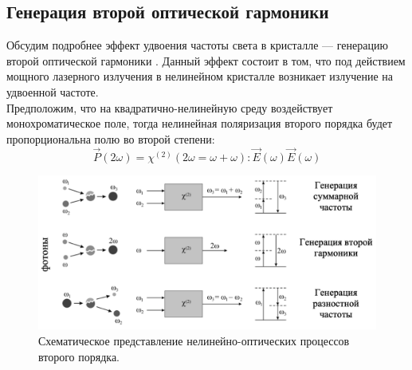 \subsection*{Генерация второй оптической гармоники} 
\hspace{2mm}
Обсудим подробнее эффект удвоения частоты света в кристалле — генерацию второй оптической гармоники \cite{achmanov2}. Данный эффект состоит в том, что под действием мощного лазерного излучения в нелинейном кристалле возникает излучение на удвоенной частоте.
\\
\hspace{2mm}
Предположим, что на квадратично-нелинейную среду воздействует монохроматическое поле, тогда нелинейная поляризация второго порядка будет пропорциональна полю во второй степени:
\begin{equation}\label{thg1}
\vec{P}(2\omega) = \chi^{(2)}(2\omega = \omega + \omega):\vec{E}(\omega)\vec{E} (\omega)
\end{equation}

\begin{figure}[h]
	\centering
	\includegraphics[width=0.6\linewidth]{images/shg.png}
	\caption{Схематическое представление нелинейно-оптических процессов второго порядка. \cite{mifi2015}}
	\label{sghPictr}
\end{figure}

